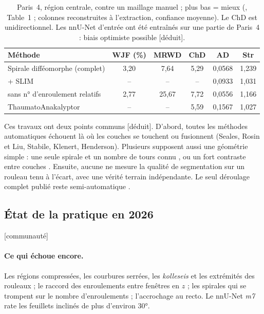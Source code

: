 \documentclass[11pt,a4paper]{article}
\newcommand{\deduit}{\textsf{\small[déduit]}}
\newcommand{\commu}{\textsf{\small[communauté]}}
\begin{document}
\begin{table}[h]
\centering\small
\begin{tabular}{@{}lccccc@{}}
\toprule
Méthode & WJF (\%) & MRWD & ChD & AD & Str \\
\midrule
Spirale difféomorphe (complet) & 3,20 & 7,64 & 5,29 & 0,0568 & 1,239 \\
\quad + SLIM & -- & -- & -- & 0,0933 & 1,031 \\
\quad sans n° d'enroulement relatifs & 2,77 & 25,67 & 7,72 & 0,0556 & 1,166 \\
ThaumatoAnakalyptor & -- & -- & 5,59 & 0,1567 & 1,027 \\
\bottomrule
\end{tabular}
\caption{Paris~4, région centrale, contre un maillage manuel ; plus bas = mieux
(\cite{henderson2025}, Table~1 ; colonnes reconstruites à l'extraction, confiance moyenne).
Le ChD est unidirectionnel. Les nnU-Net d'entrée ont été entraînés sur une partie de Paris~4 :
biais optimiste possible \deduit.}
\label{tab:spiral}
\end{table}

\noindent Ces travaux ont deux points communs \deduit. D'abord, toutes les méthodes
automatiques échouent là où les couches se touchent ou fusionnent (Seales, Rosin et Liu,
Stabile, Klenert, Henderson). Plusieurs supposent aussi une géométrie simple : une seule
spirale et un nombre de tours connu \cite{dahl2018}, ou un fort contraste entre couches
\cite{rosin2018,liu2018}. Ensuite, aucune ne mesure la qualité de segmentation sur un rouleau tenu à
l'écart, avec une vérité terrain indépendante. Le seul déroulage complet publié reste
semi-automatique \cite{angelotti2026complete}.

\subsection{État de la pratique en 2026} \commu

\paragraph{Ce qui échoue encore.} Les régions compressées, les courbures serrées, les
\emph{kolleseis} et les extrémités des rouleaux ; le raccord des enroulements entre fenêtres
en $z$ ; les spirales qui se trompent sur le nombre d'enroulements ; l'accrochage au recto. Le
nnU-Net \emph{m7} rate les feuillets inclinés de plus d'environ 30°.
\end{document}
